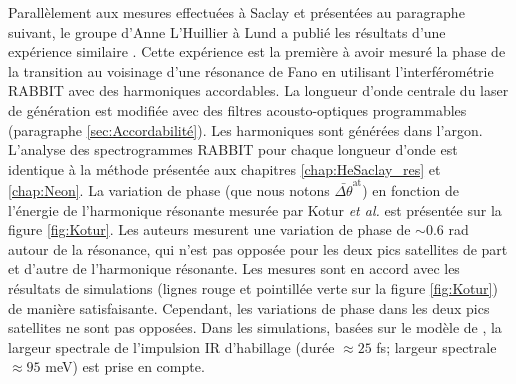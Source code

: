 Parallèlement aux mesures effectuées à Saclay et présentées au paragraphe suivant, le groupe d'Anne L'Huillier à Lund a publié les résultats d'une expérience similaire . Cette expérience est la première à avoir mesuré la phase de la transition au voisinage d'une résonance de Fano en utilisant l'interférométrie RABBIT avec des harmoniques accordables. La longueur d'onde centrale du laser de génération est modifiée avec des filtres acousto-optiques programmables (paragraphe \ref{sec:Accordabilité}). Les harmoniques sont générées dans l'argon. L'analyse des spectrogrammes RABBIT pour chaque longueur d'onde est identique à la méthode présentée aux chapitres \ref{chap:HeSaclay_res} et \ref{chap:Neon}. La variation de phase (que nous notons $\bar{\Delta \theta}^{\text{at}}$) en fonction de l'énergie de l'harmonique résonante mesurée par Kotur \textit{et al.} est présentée sur la figure \ref{fig:Kotur}. Les auteurs mesurent une variation de phase de $\sim 0.6$ rad autour de la résonance, qui n'est pas opposée pour les deux pics satellites de part et d'autre de l'harmonique résonante. Les mesures sont en accord avec les résultats de simulations (lignes rouge et pointillée verte sur la figure \ref{fig:Kotur}) de manière satisfaisante. Cependant, les variations de phase dans les deux pics satellites ne sont pas opposées. Dans les simulations, basées sur le modèle de , la largeur spectrale de l'impulsion IR d'habillage (durée $\approx 25$ fs; largeur spectrale $\approx 95$ meV) est prise en compte.

